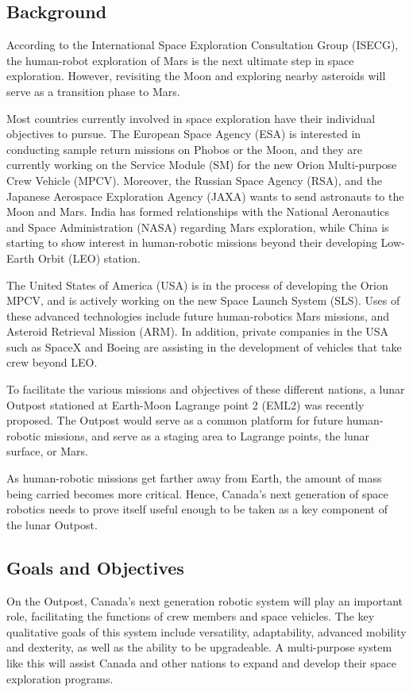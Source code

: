 \documentclass[12pt, letter]{article}
\begin{document}
\subsection{Background}
\label{background}
According to the International Space Exploration Consultation Group (ISECG), the human-robot exploration of Mars is the next ultimate step in space exploration.\cite{RFP} However, revisiting the Moon and exploring nearby asteroids will serve as a transition phase to Mars. 

Most countries currently involved in space exploration have their individual objectives to pursue. The European Space Agency (ESA) is interested in conducting sample return missions on Phobos or the Moon, and they are currently working on the Service Module (SM) for the new Orion Multi-purpose Crew Vehicle (MPCV). Moreover, the Russian Space Agency (RSA), and the Japanese Aerospace Exploration Agency (JAXA) wants to send astronauts to the Moon and Mars. India has formed relationships with the National Aeronautics and Space Administration (NASA) regarding Mars exploration, while China is starting to show interest in human-robotic missions beyond their developing Low-Earth Orbit (LEO) station.\cite{RFP}

The United States of America (USA) is in the process of developing the Orion MPCV, and is actively working on the new Space Launch System (SLS). Uses of these advanced technologies include future human-robotics Mars missions, and Asteroid Retrieval Mission (ARM). In addition, private companies in the USA such as SpaceX and Boeing are assisting in the development of vehicles that take crew beyond LEO.\cite{RFP}

To facilitate the various missions and objectives of these different nations, a lunar Outpost stationed at Earth-Moon Lagrange point 2 (EML2) was recently proposed. The Outpost would serve as a common platform for future human-robotic missions, and serve as a staging area to Lagrange points, the lunar surface, or Mars.\cite{RFP}

As human-robotic missions get farther away from Earth, the amount of mass being carried becomes more critical. Hence, Canada's next generation of space robotics needs to prove itself useful enough to be taken as a key component of the lunar Outpost.
\subsection{Goals and Objectives}
\label{goals}
On the Outpost, Canada's next generation robotic system will play an important role, facilitating the functions of crew members and space vehicles. The key qualitative goals of this system include versatility, adaptability, advanced mobility and dexterity, as well as the ability to be upgradeable.\cite{RFP} A multi-purpose system like this will assist Canada and other nations to expand and develop their space exploration programs. 
\end{document}
